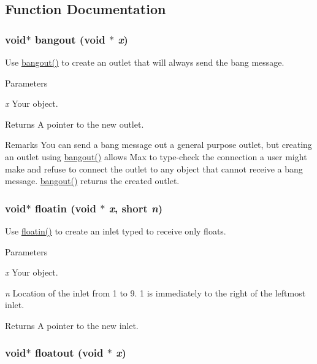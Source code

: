 \subsection{Function Documentation}
\hypertarget{group__inout_ga69d26d4f2684aab7dbc1b2d18248eae5}{
\subsubsection[{bangout}]{\setlength{\rightskip}{0pt plus 5cm}void$\ast$ bangout (void $\ast$ {\em x})}}
\label{group__inout_ga69d26d4f2684aab7dbc1b2d18248eae5}


Use \hyperlink{group__inout_ga69d26d4f2684aab7dbc1b2d18248eae5}{bangout()} to create an outlet that will always send the bang message. 
\begin{DoxyParams}{Parameters}
\item[{\em x}]Your object. \end{DoxyParams}
\begin{DoxyReturn}{Returns}
A pointer to the new outlet.
\end{DoxyReturn}
\begin{DoxyRemark}{Remarks}
You can send a bang message out a general purpose outlet, but creating an outlet using \hyperlink{group__inout_ga69d26d4f2684aab7dbc1b2d18248eae5}{bangout()} allows Max to type-\/check the connection a user might make and refuse to connect the outlet to any object that cannot receive a bang message. \hyperlink{group__inout_ga69d26d4f2684aab7dbc1b2d18248eae5}{bangout()} returns the created outlet. 
\end{DoxyRemark}
\hypertarget{group__inout_ga01125a22c75ef028199febbe21346f0e}{
\subsubsection[{floatin}]{\setlength{\rightskip}{0pt plus 5cm}void$\ast$ floatin (void $\ast$ {\em x}, \/  short {\em n})}}
\label{group__inout_ga01125a22c75ef028199febbe21346f0e}


Use \hyperlink{group__inout_ga01125a22c75ef028199febbe21346f0e}{floatin()} to create an inlet typed to receive only floats. 
\begin{DoxyParams}{Parameters}
\item[{\em x}]Your object. \item[{\em n}]Location of the inlet from 1 to 9. 1 is immediately to the right of the leftmost inlet. \end{DoxyParams}
\begin{DoxyReturn}{Returns}
A pointer to the new inlet. 
\end{DoxyReturn}
\hypertarget{group__inout_ga0881da69192bb254b8c0bf767c657461}{
\subsubsection[{floatout}]{\setlength{\rightskip}{0pt plus 5cm}void$\ast$ floatout (void $\ast$ {\em x})}}
\label{group__inout_ga0881da69192bb254b8c0bf767c657461}


